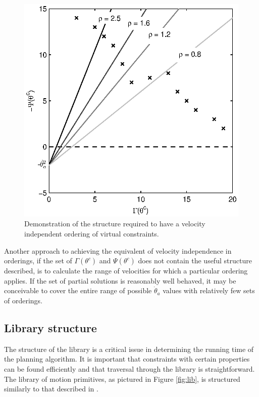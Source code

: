\begin{figure}
\centering
\includegraphics[width=0.8\linewidth]{4VirtConstLib/totord}
\caption[Velocity independent ordering of virtual constraints]{Demonstration of the structure required to have a velocity independent ordering of virtual constraints.}
\label{fig:totord}
\end{figure}

Another approach to achieving the equivalent of velocity independence in orderings, if the set of $\Gamma(\theta^c)$ and $\Psi(\theta^c)$ does not contain the useful structure described, is to calculate the range of velocities for which a particular ordering applies. If the set of partial solutions is reasonably well behaved, it may be conceivable to cover the entire range of possible $\dot{\theta}_a$ values with relatively few sets of orderings.

\subsection{Library structure}
The structure of the library is a critical issue in determining the running time of the planning algorithm. It is important that constraints with certain properties can be found efficiently and that traversal through the library is straightforward. The library of motion primitives, as pictured in Figure \ref{fig:lib}, is structured similarly to that described in \cite{manchester13planning}.

